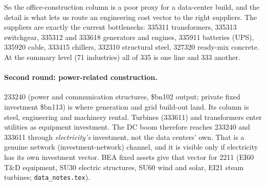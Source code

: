 \documentclass[11pt]{article}
\newcommand{\bn}{\$bn}
\begin{document}
So the office-construction column is a poor proxy for a data-center build, and the detail is what lets us route an engineering cost vector to the right suppliers. The suppliers are exactly the current bottlenecks: 335311 transformers, 335313 switchgear, 335312 and 333618 generators and engines, 335911 batteries (UPS), 335920 cable, 333415 chillers, 332310 structural steel, 327320 ready-mix concrete. At the summary level (71 industries) all of 335 is one line and 333 another.

\paragraph{Second round: power-related construction.} 233240 (power and communication structures, \bn102 output; private fixed investment \bn113) is where generation and grid build-out land. Its column is steel, engineering and machinery rental. Turbines (333611) and transformers enter utilities as equipment investment. The DC boom therefore reaches 233240 and 333611 through \emph{electricity's} investment, not the data centers' own. That is a genuine network (investment-network) channel, and it is visible only if electricity has its own investment vector. BEA fixed assets give that vector for 2211 (EI60 T\&D equipment, SU30 electric structures, SU60 wind and solar, EI21 steam turbines; \texttt{data\_notes.tex}).
\end{document}
